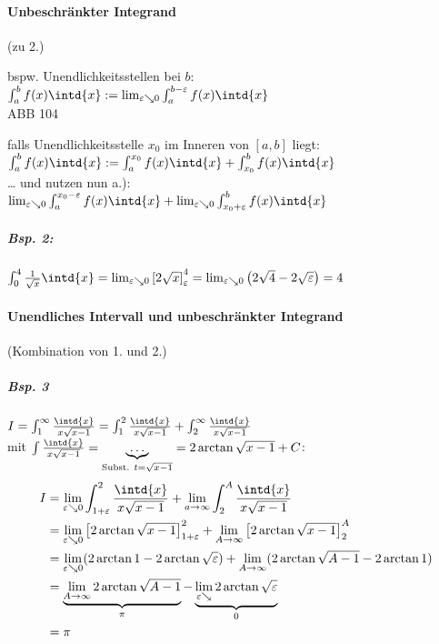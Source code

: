 \paragraph{Unbeschränkter Integrand} (zu 2.)
\begin{anumerate}
\item bspw. Unendlichkeitsstellen bei $b$:\\
$\int_a^b f(x) \intd{x} := \lim_{\varepsilon \searrow 0} \int_a^{b-\varepsilon} f(x) \intd{x}$\\
ABB 104
\item falls Unendlichkeitsstelle $x_0$ im Inneren von $[a,b]$ liegt:\\
$\int_a^b f(x) \intd{x} := \int_a^{x_0} f(x) \intd{x} + \int_{x_0}^b f(x) \intd{x}$\\
… und nutzen nun a.):\\
$\lim_{\varepsilon\searrow 0} \int_a^{x_0-\varepsilon} f(x) \intd{x} + \lim_{\varepsilon\searrow 0} \int_{x_0 + \varepsilon}^b f(x) \intd{x}$
\end{anumerate}
\subparagraph{Bsp. 2:} \parskp
$\int_0^4 \frac{1}{\sqrt{x}}\intd{x} = \lim_{\varepsilon\searrow0} \left[2\sqrt{x}\right]_{\varepsilon}^4 = \lim_{\varepsilon \searrow 0} \left( 2 \sqrt{4}-2 \sqrt{\varepsilon}\right) = 4$
\paragraph{Unendliches Intervall und unbeschränkter Integrand} (Kombination von 1. und 2.)
\subparagraph{Bsp. 3} \parskp
$I = \int_1^{\infty} \frac{\intd{x}}{x \sqrt{x-1}}= \int_1^2 \frac{\intd{x}}{x\sqrt{x-1}}+ \int_2^{\infty} \frac{\intd{x}}{x\sqrt{x-1}}$\\
mit $\int \frac{\intd{x}}{x\sqrt{x-1}}= \underbrace{\dots}_{\text{Subst. }t=\sqrt{x-1}} = 2 \arctan \sqrt{x-1} + C$:
\begin{align*}
I &= \lim_{\varepsilon \searrow 0} \int_{1+\varepsilon}^2 \frac{\intd{x}}{x \sqrt{x-1}}+ \lim_{a\to \infty} \int_2^A \frac{\intd{x}}{x\sqrt{x-1}}\\
&= \lim_{\varepsilon\searrow0} \left[ 2\arctan \sqrt{x-1}\right]_{1+\varepsilon}^2 + \lim_{A\to \infty} \left[ 2 \arctan\sqrt{x-1}\right]_2^A\\
&= \lim_{\varepsilon\searrow 0} ( 2 \arctan 1 - 2 \arctan \sqrt{\varepsilon}) + \lim_{A\to\infty} (2 \arctan \sqrt{A-1}-2\arctan 1 )\\
&= \underbrace{\lim_{A \to \infty} 2 \arctan \sqrt{A-1}}_{\pi} - \underbrace{\lim_{\varepsilon \searrow} 2 \arctan \sqrt{\varepsilon}}_{0}\\
&= \pi
\end{align*}

